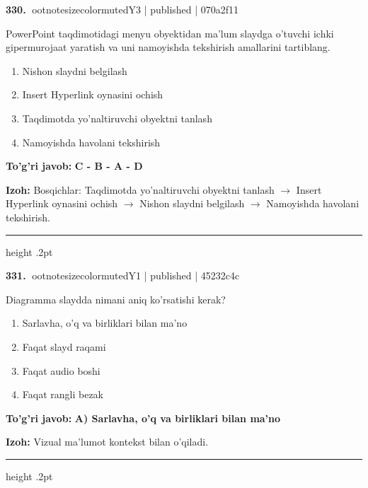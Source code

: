 \documentclass[10pt,a4paper]{article}
\begin{document}
\textbf{\color{ink}330.} {ootnotesizecolor{muted}Y3 | published | 070a2f11}
\par
PowerPoint taqdimotidagi menyu obyektidan ma'lum slaydga o'tuvchi ichki gipermurojaat yaratish va uni namoyishda tekshirish amallarini tartiblang.
\begin{enumerate}[label=\Alph*),leftmargin=9mm]
\item Nishon slaydni belgilash
\item Insert Hyperlink oynasini ochish
\item Taqdimotda yo'naltiruvchi obyektni tanlash
\item Namoyishda havolani tekshirish
\end{enumerate}
\begin{tcolorbox}[enhanced,breakable,colback=teal!4,colframe=teal!55!black,boxrule=0.45pt,arc=1.2mm,left=2.8mm,right=2.8mm,top=2mm,bottom=2mm]
\textbf{\color{teal}To'g'ri javob:} \textbf{C - B - A - D}
\par\smallskip
\textbf{Izoh:} Bosqichlar: Taqdimotda yo'naltiruvchi obyektni tanlash \ensuremath{\rightarrow} Insert Hyperlink oynasini ochish \ensuremath{\rightarrow} Nishon slaydni belgilash \ensuremath{\rightarrow} Namoyishda havolani tekshirish.
\end{tcolorbox}
\vspace{2mm}\hrule height .2pt\vspace{2mm}

\textbf{\color{ink}331.} {ootnotesizecolor{muted}Y1 | published | 45232c4c}
\par
Diagramma slaydda nimani aniq ko'rsatishi kerak?
\begin{enumerate}[label=\Alph*),leftmargin=9mm]
\item Sarlavha, o'q va birliklari bilan ma'no
\item Faqat slayd raqami
\item Faqat audio boshi
\item Faqat rangli bezak
\end{enumerate}
\begin{tcolorbox}[enhanced,breakable,colback=teal!4,colframe=teal!55!black,boxrule=0.45pt,arc=1.2mm,left=2.8mm,right=2.8mm,top=2mm,bottom=2mm]
\textbf{\color{teal}To'g'ri javob:} \textbf{A) Sarlavha, o'q va birliklari bilan ma'no}
\par\smallskip
\textbf{Izoh:} Vizual ma'lumot kontekst bilan o'qiladi.
\end{tcolorbox}
\vspace{2mm}\hrule height .2pt\vspace{2mm}
\end{document}
